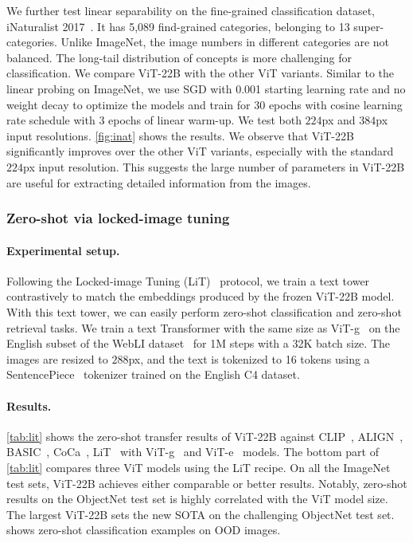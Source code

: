 \documentclass{article}
\newcommand{\chonk}{\mbox{ViT-22B}\xspace}
\begin{document}
We further test linear separability on the fine-grained classification dataset, iNaturalist 2017~\citep{cui2018large}. It has 5,089 find-grained categories, belonging to 13 super-categories. Unlike ImageNet, the image numbers in different categories are not balanced. The long-tail distribution of concepts is more challenging for classification. We compare \chonk with the other ViT variants. 
Similar to the linear probing on ImageNet, we use SGD with 0.001 starting learning rate and no weight decay to optimize the models and train for 30 epochs with cosine learning rate schedule with 3 epochs of linear warm-up. We test both $224$px and $384$px input resolutions. \cref{fig:inat} shows the results. We observe that \chonk significantly improves over the other ViT variants, especially with the standard $224$px input resolution. This suggests the large number of parameters in \chonk are useful for extracting detailed information from the images. 

\subsubsection{Zero-shot via locked-image tuning}
\label{sect::lit}
\paragraph{Experimental setup.}
Following the Locked-image Tuning (LiT)~\citep{lit} protocol, we train a text tower contrastively to match the embeddings produced by the frozen \chonk model.
With this text tower, we can easily perform zero-shot classification and zero-shot retrieval tasks.
We train a text Transformer with the same size as ViT-g~\citep{zhai2022scaling} on the English subset of the WebLI dataset~\citep{chen2022pali} for 1M steps with a 32K batch size.
The images are resized to $288$px, and the text is tokenized to 16 tokens using a SentencePiece~\citep{kudo-richardson-2018-sentencepiece} tokenizer trained on the English C4 dataset.

\paragraph{Results.}
\cref{tab:lit} shows the zero-shot transfer results of \chonk against CLIP~\citep{clip}, ALIGN~\citep{align}, BASIC~\citep{basic}, CoCa~\citep{yu2022coca}, LiT~\citep{lit} with ViT-g~\citep{zhai2022scaling} and ViT-e~\citep{chen2022pali} models. 
The bottom part of \cref{tab:lit} compares three ViT models using the LiT recipe.
On all the ImageNet test sets, \chonk{} achieves either comparable or better results. 
Notably, zero-shot results on the ObjectNet test set is highly correlated with the ViT model size. 
The largest \chonk{} sets the new SOTA on the challenging ObjectNet test set.
 shows zero-shot classification examples on OOD images.
\end{document}
